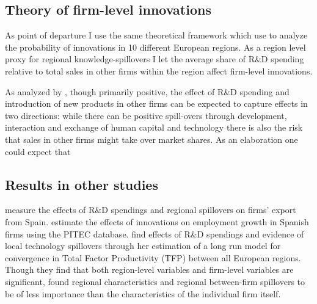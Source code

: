 \label{sec:background}
\subsection{Theory of firm-level innovations}
\label{subsec:theory}
As point of departure I use the same theoretical framework which \citet{sternberg2001firm} use to analyze the probability of innovations in 10 different European regions. As a region level proxy for regional knowledge-spillovers I let the average share of R\&D spending relative to total sales in other firms within the region affect firm-level innovations.

As analyzed by \citet{harrison2014does}, though primarily positive, the effect of R\&D spending and introduction of new products in other firms can be expected to capture effects in two directions: while there can be positive spill-overs through development, interaction and exchange of human capital and technology there is also the risk that sales in other firms might take over market shares. As an elaboration one could expect that

\subsection{Results in other studies}
\label{subsec:other_studies}
\citet{barrios2001explaining} measure the effects of R\&D spendings and regional spillovers on firms' export from Spain. \citet{harrison2014does} estimate the effects of innovations on employment growth in Spanish firms using the PITEC database. \citet{vogel2015two} find effects of R\&D spendings and evidence of local technology spillovers through her estimation of a long run model for convergence in Total Factor Productivity (TFP) between all European regions. Though they find that both region-level variables and firm-level variables are significant, \citet{sternberg2001firm} found regional characteristics and regional between-firm spillovers to be of less importance than the characteristics of the individual firm itself.
